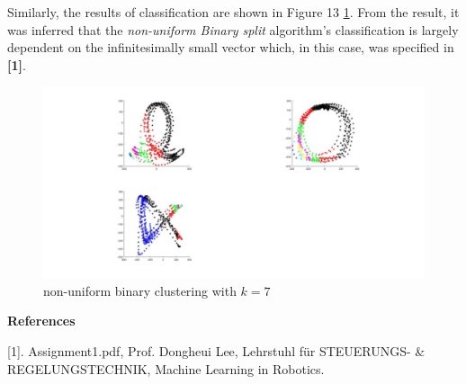 \documentclass[10pt,a4paper]{report}
\begin{document}
Similarly, the results of classification are shown in Figure 13 \ref{fig:fig_13}. From the result, it was inferred that the \emph{non-uniform Binary split} algorithm's classification is largely dependent on the infinitesimally small vector which, in this case, was specified in \textbf{[1]}.

\begin{figure}[!ht]
	\graphicspath{{./Exercise3/}}
	\centering
	\includegraphics[scale=0.15]{nubf}	
	
	\begin{flushleft}
	\caption{non-uniform binary clustering with $k=7$}
	\end{flushleft}
	\label{fig:fig_13}
	
\end{figure}

\clearpage
\begin{center}
	\textbf{\large{References}}\\
\end{center}
[1]. Assignment1.pdf, Prof. Dongheui Lee, Lehrstuhl f\"ur STEUERUNGS-
\& REGELUNGSTECHNIK, Machine Learning in Robotics.
\end{document}

